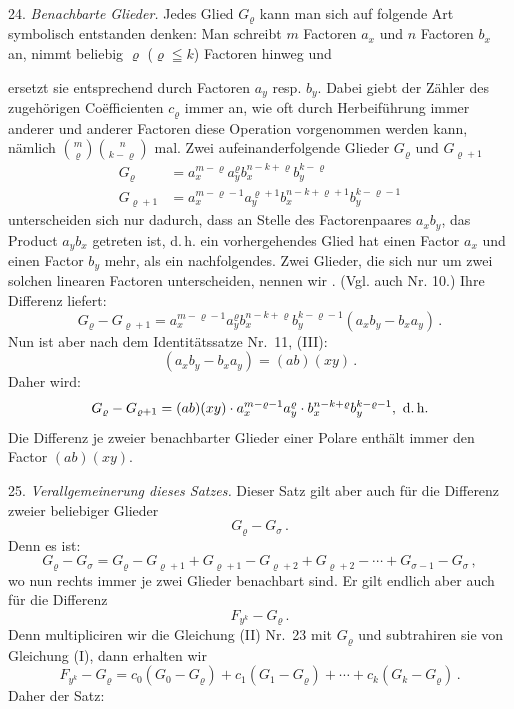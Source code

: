 \documentclass[11pt]{article}
\providecommand{\gesperrt}[1]{\textls[130]{#1}}
\providecommand{\weberpage}[1]{}
\begin{document}
24. \textit{Benachbarte Glieder.} Jedes Glied $G_\varrho$ kann man sich auf folgende Art symbolisch entstanden denken: Man schreibt $m$ Factoren $a_x$ und $n$ Factoren $b_x$ an, nimmt beliebig $\varrho$ ($\varrho\leqq k$) Factoren hinweg und


\weberpage{26}
ersetzt sie entsprechend durch Factoren $a_y$ resp. $b_y$. Dabei giebt der Zähler des zugehörigen Co\"efficienten $c_\varrho$ immer an, wie oft durch Herbeiführung immer anderer und anderer Factoren diese Operation vorgenommen werden kann, nämlich $\binom{m}{\varrho}\binom{n}{k-\varrho}$ mal. Zwei aufeinanderfolgende Glieder $G_\varrho$ und $G_{\varrho+1}$
\[
\begin{aligned}
G_\varrho &= a_x^{m-\varrho}a_y^\varrho b_x^{n-k+\varrho}b_y^{k-\varrho}\\
G_{\varrho+1} &= a_x^{m-\varrho-1}a_y^{\varrho+1}b_x^{n-k+\varrho+1}b_y^{k-\varrho-1}
\end{aligned}
\]
unterscheiden sich nur dadurch, dass an Stelle des Factorenpaares $a_xb_y$, das Product $a_yb_x$ getreten ist, d.\,h. ein vorhergehendes Glied hat einen Factor $a_x$ und einen Factor $b_y$ mehr, als ein nachfolgendes. Zwei Glieder, die sich nur um zwei solchen linearen Factoren unterscheiden, nennen wir \glqq\gesperrt{benachbarte Glieder}\grqq{}. (Vgl. auch Nr. 10.) Ihre Differenz liefert:
\[
G_\varrho-G_{\varrho+1}=a_x^{m-\varrho-1}a_y^\varrho b_x^{n-k+\varrho}b_y^{k-\varrho-1}(a_xb_y-b_xa_y)\,.
\]
Nun ist aber nach dem Identitätssatze Nr.\ 11, (III):
\[
(a_xb_y-b_xa_y)=(ab)(xy)\,.
\]
Daher wird:
\[
G_\varrho-G_{\varrho+1}=(ab)(xy)\cdot a_x^{m-\varrho-1}a_y^\varrho\cdot b_x^{n-k+\varrho}b_y^{k-\varrho-1},\ \text{d.\,h.}
\]
\glqq Die Differenz je zweier benachbarter Glieder einer Polare enthält immer den Factor $(ab)(xy)$.\grqq{}

25. \textit{Verallgemeinerung dieses Satzes.} Dieser Satz gilt aber auch für die Differenz zweier beliebiger Glieder
\[
G_\varrho-G_\sigma\,.
\]
Denn es ist:
\[
G_\varrho-G_\sigma=G_\varrho-G_{\varrho+1}+G_{\varrho+1}-G_{\varrho+2}+G_{\varrho+2}-\cdots+G_{\sigma-1}-G_\sigma\,,
\]
wo nun rechts immer je zwei Glieder benachbart sind. Er gilt endlich aber auch für die Differenz
\[
F_{y^k}-G_\varrho\,.
\]
Denn multipliciren wir die Gleichung (II) Nr.\ 23 mit $G_\varrho$ und subtrahiren sie von Gleichung (I), dann erhalten wir
\[
F_{y^k}-G_\varrho=c_0(G_0-G_\varrho)+c_1(G_1-G_\varrho)+\cdots+c_k(G_k-G_\varrho)\,.
\]
Daher der Satz:
\end{document}
